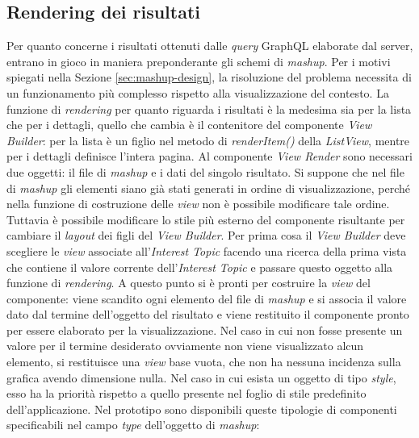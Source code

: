 \subsection{Rendering dei risultati}\label{sec:view-risultati}

Per quanto concerne i risultati ottenuti dalle \emph{query} GraphQL elaborate dal server, entrano in gioco in maniera preponderante gli schemi di \emph{mashup}. Per i motivi spiegati nella Sezione \ref{sec:mashup-design}, la risoluzione del problema necessita di un funzionamento più complesso rispetto alla visualizzazione del contesto. La funzione di \emph{rendering} per quanto riguarda i risultati è la medesima sia per la lista che per i dettagli, quello che cambia è il contenitore del componente \emph{View Builder}: per la lista è un figlio nel metodo di \emph{renderItem()} della \emph{ListView}, mentre per i dettagli definisce l'intera pagina.
Al componente \emph{View Render} sono necessari due oggetti: il file di \emph{mashup} e i dati del singolo risultato.
Si suppone che nel file di \textit{mashup} gli elementi siano già stati generati in ordine di visualizzazione, perché nella funzione di costruzione delle \emph{view} non è possibile modificare tale ordine. Tuttavia è possibile modificare lo stile più esterno del componente risultante per cambiare il \emph{layout} dei figli del \emph{View Builder}. Per prima cosa il \emph{View Builder} deve scegliere le \emph{view} associate all'\emph{Interest Topic} facendo una ricerca della prima vista che contiene il valore corrente dell'\emph{Interest Topic} e passare questo oggetto alla funzione di \textit{rendering}. A questo punto si è pronti per costruire la \emph{view} del componente: viene scandito ogni elemento del file di \textit{mashup} e si associa il valore dato dal termine dell'oggetto del risultato e viene restituito il componente pronto per essere elaborato per la visualizzazione. Nel caso in cui non fosse presente un valore per il termine desiderato ovviamente non viene visualizzato alcun elemento, si restituisce una \emph{view} base vuota, che non ha nessuna incidenza sulla grafica avendo dimensione nulla. Nel caso in cui esista un oggetto di tipo \emph{style}, esso ha la priorità rispetto a quello presente nel foglio di stile predefinito dell'applicazione. Nel prototipo sono disponibili queste tipologie di componenti specificabili nel campo \emph{type} dell'oggetto di \textit{mashup}:

